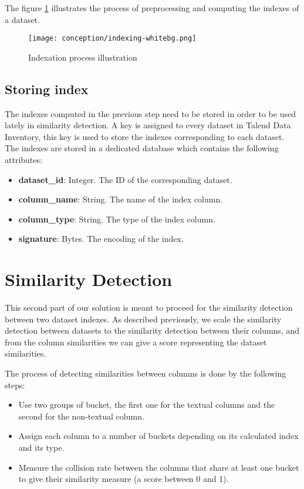 The figure \ref{fig:indexation_process} illustrates the process of preprocessing
and computing the indexes of a dataset.

\begin{figure}[h]
    \centering
    \texttt{[image: conception/indexing-whitebg.png]}
    \caption{Indexation process illustration}
    \label{fig:indexation_process}
\end{figure}

\subsection{Storing index}
The indexes computed in the previous step need to be stored in order to be used
lately in similarity detection. A key is assigned to every dataset in Talend
Data Inventory, this key is used to store the indexes corresponding to each
dataset. The indexes are stored in a dedicated database which contains the
following attributes:

\begin{itemize}
    \item \textbf{dataset\_id}: Integer. The ID of the corresponding dataset.
    \item \textbf{column\_name}: String. The name of the index column.
    \item \textbf{column\_type}: String. The type of the index column.
    \item \textbf{signature}: Bytes. The encoding of the index.
\end{itemize}


\section{Similarity Detection}
This second part of our solution is meant to proceed for the similarity
detection between two dataset indexes. As described previously, we scale the
similarity detection between datasets to the similarity detection between their
columns, and from the column similarities we can give a score representing the
dataset similarities. 

The process of detecting similarities between columns is
done by the following steps:

\begin{itemize}
    \item Use two groups of bucket, the first one for the textual columns and
    the second for the non-textual column.
    \item Assign each column to a number of buckets depending on its
     calculated index and its type.
    \item Measure the collision rate between the columns that share at least one
    bucket to give their similarity measure (a score between 0 and 1).
\end{itemize}

